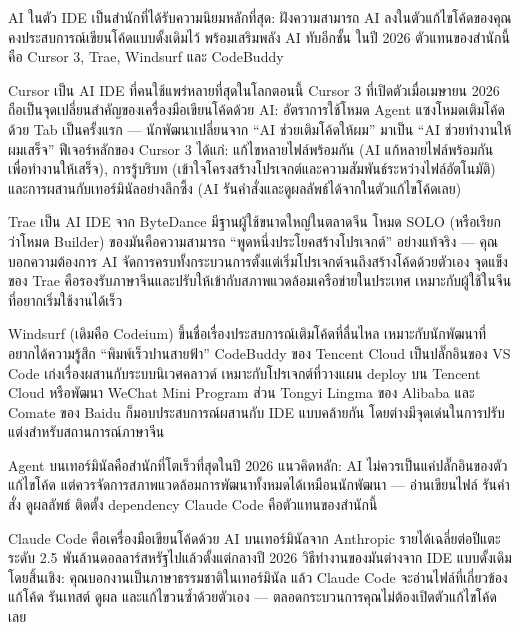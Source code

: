 
AI ในตัว IDE เป็นสำนักที่ได้รับความนิยมหลักที่สุด: ฝังความสามารถ AI ลงในตัวแก้ไขโค้ดของคุณ คงประสบการณ์เขียนโค้ดแบบดั้งเดิมไว้ พร้อมเสริมพลัง AI ทับอีกชั้น ในปี 2026 ตัวแทนของสำนักนี้คือ Cursor 3, Trae, Windsurf และ CodeBuddy


Cursor เป็น AI IDE ที่คนใช้แพร่หลายที่สุดในโลกตอนนี้ Cursor 3 ที่เปิดตัวเมื่อเมษายน 2026 ถือเป็นจุดเปลี่ยนสำคัญของเครื่องมือเขียนโค้ดด้วย AI: อัตราการใช้โหมด Agent แซงโหมดเติมโค้ดด้วย Tab เป็นครั้งแรก — นักพัฒนาเปลี่ยนจาก “AI ช่วยเติมโค้ดให้ผม” มาเป็น “AI ช่วยทำงานให้ผมเสร็จ” ฟีเจอร์หลักของ Cursor 3 ได้แก่: แก้ไขหลายไฟล์พร้อมกัน (AI แก้หลายไฟล์พร้อมกันเพื่อทำงานให้เสร็จ), การรู้บริบท (เข้าใจโครงสร้างโปรเจกต์และความสัมพันธ์ระหว่างไฟล์อัตโนมัติ) และการผสานกับเทอร์มินัลอย่างลึกซึ้ง (AI รันคำสั่งและดูผลลัพธ์ได้จากในตัวแก้ไขโค้ดเลย)


Trae เป็น AI IDE จาก ByteDance มีฐานผู้ใช้ขนาดใหญ่ในตลาดจีน โหมด SOLO (หรือเรียกว่าโหมด Builder) ของมันคือความสามารถ “พูดหนึ่งประโยคสร้างโปรเจกต์” อย่างแท้จริง — คุณบอกความต้องการ AI จัดการครบทั้งกระบวนการตั้งแต่เริ่มโปรเจกต์จนถึงสร้างโค้ดด้วยตัวเอง จุดแข็งของ Trae คือรองรับภาษาจีนและปรับให้เข้ากับสภาพแวดล้อมเครือข่ายในประเทศ เหมาะกับผู้ใช้ในจีนที่อยากเริ่มใช้งานได้เร็ว


Windsurf (เดิมคือ Codeium) ขึ้นชื่อเรื่องประสบการณ์เติมโค้ดที่ลื่นไหล เหมาะกับนักพัฒนาที่อยากได้ความรู้สึก “พิมพ์เร็วปานสายฟ้า” CodeBuddy ของ Tencent Cloud เป็นปลั๊กอินของ VS Code เก่งเรื่องผสานกับระบบนิเวศคลาวด์ เหมาะกับโปรเจกต์ที่วางแผน deploy บน Tencent Cloud หรือพัฒนา WeChat Mini Program ส่วน Tongyi Lingma ของ Alibaba และ Comate ของ Baidu ก็มอบประสบการณ์ผสานกับ IDE แบบคล้ายกัน โดยต่างมีจุดเด่นในการปรับแต่งสำหรับสถานการณ์ภาษาจีน


Agent บนเทอร์มินัลคือสำนักที่โตเร็วที่สุดในปี 2026 แนวคิดหลัก: AI ไม่ควรเป็นแค่ปลั๊กอินของตัวแก้ไขโค้ด แต่ควรจัดการสภาพแวดล้อมการพัฒนาทั้งหมดได้เหมือนนักพัฒนา — อ่านเขียนไฟล์ รันคำสั่ง ดูผลลัพธ์ ติดตั้ง dependency Claude Code คือตัวแทนของสำนักนี้


Claude Code คือเครื่องมือเขียนโค้ดด้วย AI บนเทอร์มินัลจาก Anthropic รายได้เฉลี่ยต่อปีแตะระดับ 2.5 พันล้านดอลลาร์สหรัฐไปแล้วตั้งแต่กลางปี 2026 วิธีทำงานของมันต่างจาก IDE แบบดั้งเดิมโดยสิ้นเชิง: คุณบอกงานเป็นภาษาธรรมชาติในเทอร์มินัล แล้ว Claude Code จะอ่านไฟล์ที่เกี่ยวข้อง แก้โค้ด รันเทสต์ ดูผล และแก้ไขวนซ้ำด้วยตัวเอง — ตลอดกระบวนการคุณไม่ต้องเปิดตัวแก้ไขโค้ดเลย

